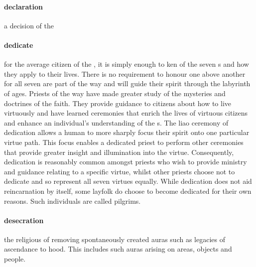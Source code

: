 \paragraph{declaration} a decision of the  %
\paragraph{dedicate} for the average citizen of the , it is simply enough to ken of the seven s and how they apply to their lives. There is no requirement to honour one above another for all seven are part of the way and will guide their spirit through the labyrinth of ages. Priests of the way have made greater study of the mysteries and doctrines of the faith. They provide guidance to citizens about how to live virtuously and have learned ceremonies that enrich the lives of virtuous citizens and enhance an individual’s understanding of the s. The liao ceremony of dedication allows a human to more sharply focus their spirit onto one particular virtue path. This focus enables a dedicated priest to perform other ceremonies that provide greater insight and illumination into the virtue. Consequently, dedication is reasonably common amongst priests who wish to provide ministry and guidance relating to a specific virtue, whilst other priests choose not to dedicate and so represent all seven virtues equally. While dedication does not aid reincarnation by itself, some layfolk do choose to become dedicated for their own reasons. Such individuals are called pilgrims. 
\paragraph{desecration} the religious  of removing spontaneously created auras such as legacies of ascendance to hood. This includes such auras arising on areas, objects and people.
